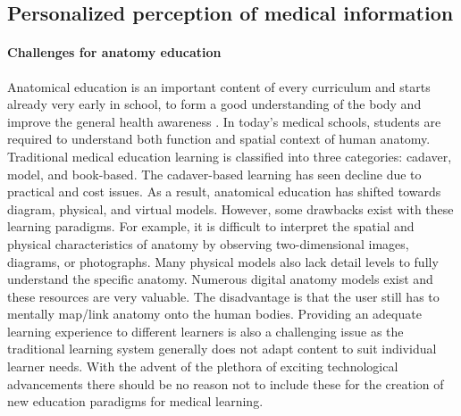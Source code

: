 \subsection{Personalized perception of medical information}
\paragraph{Challenges for anatomy education}
Anatomical education is an important content of every curriculum and starts already very early in school, to form a good understanding of the body and improve the general health awareness \cite{Dunnill2013}. In today's medical schools, students are required to understand both function and spatial context of human anatomy. Traditional medical education learning is classified into three categories: cadaver, model, and book-based. The cadaver-based learning has seen decline due to practical and cost issues. As a result, anatomical education has shifted towards diagram, physical, and virtual models. However, some drawbacks exist with these learning paradigms. For example, it is difficult to interpret the spatial and physical characteristics of anatomy by observing two-dimensional images, diagrams, or photographs. Many physical models also lack detail levels to fully understand the specific anatomy. 
Numerous digital anatomy models exist and these resources are very valuable. The disadvantage is that the user still has to mentally map/link anatomy onto the human bodies.
Providing an adequate learning experience to different learners is also a challenging issue as the traditional learning system generally does not adapt content to suit individual learner needs.
With the advent of the plethora of exciting technological advancements there should be no reason not to include these for the creation of new education paradigms for medical learning. 

